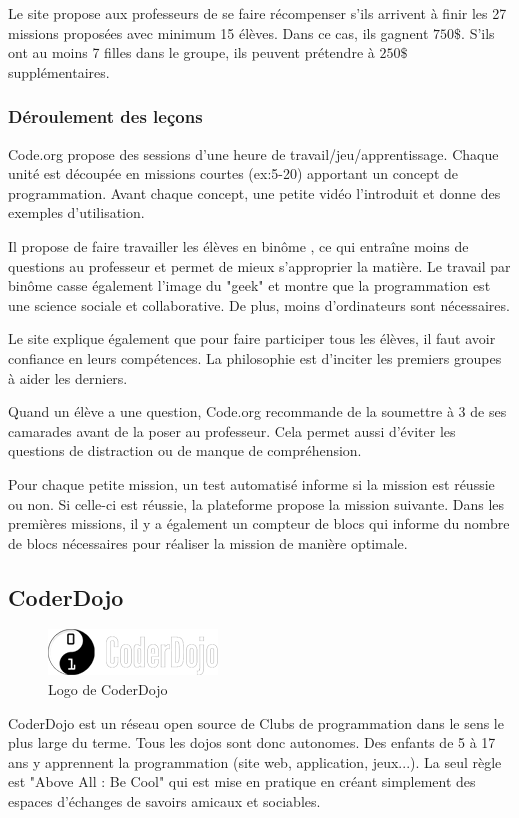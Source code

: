 Le site propose aux professeurs de se faire récompenser s'ils arrivent à finir les 27 \glspl{mission} proposées avec minimum 15 élèves. Dans ce cas, ils gagnent $750\$$. S'ils ont au moins 7 filles dans le groupe, ils peuvent prétendre à $250\$$ supplémentaires.

\subsubsection{Déroulement des leçons}
Code.org propose des sessions d'une heure de travail/jeu/apprentissage. Chaque unité est découpée en \glspl{mission} courtes (ex:5-20) apportant un concept de programmation. Avant chaque concept, une petite vidéo l'introduit et donne des exemples d'utilisation.

Il propose de faire travailler les élèves en binôme \cite{wiki-pair-prog}, ce qui entraîne moins de questions au professeur et permet de mieux s'approprier la matière. Le travail par binôme casse également l'image du "geek" et montre que la programmation est une science sociale et collaborative. De plus, moins d'ordinateurs sont nécessaires.

Le site explique également que pour faire participer tous les élèves, il faut avoir confiance en leurs compétences. La philosophie est d'inciter les premiers groupes à aider les derniers.

Quand un élève a une question, Code.org recommande de la soumettre à 3 de ses camarades avant de la poser au professeur. Cela permet aussi d'éviter les questions de distraction ou de manque de compréhension.

Pour chaque petite \gls{mission}, un test automatisé informe si la \gls{mission} est réussie ou non. Si celle-ci est réussie, la plateforme propose la \gls{mission} suivante. Dans les premières \glspl{mission}, il y a également un compteur de \glspl{bloc} qui informe du nombre de \glspl{bloc} nécessaires pour réaliser la \gls{mission} de manière optimale.

\subsection{CoderDojo}
\begin{figure}[!ht]
  \begin{center}
    \includegraphics[scale=0.5]{content/5-related_work/images/dojo}
    \caption{Logo de CoderDojo}
    \label{fig:coder dojo}
  \end{center}
\end{figure}
CoderDojo \cite{dojo-about} est un réseau open source de Clubs de programmation dans le sens le plus large du terme. Tous les dojos sont donc autonomes. Des enfants de 5 à 17 ans y apprennent la programmation (site web, application, jeux...). La seul règle est "Above All : Be Cool" qui est mise en pratique en créant simplement des espaces d'échanges de savoirs amicaux et sociables.

